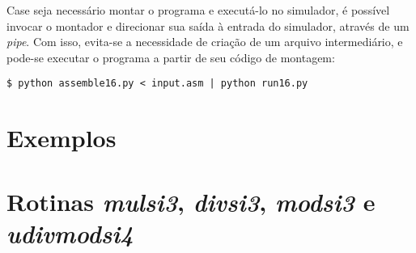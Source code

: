 \documentclass{extreport}
\begin{document}
Case seja necessário montar o programa e executá-lo no simulador, é possível invocar o montador e direcionar sua saída à entrada do simulador, através de um \textit{pipe}. Com isso, evita-se a necessidade de criação de um arquivo intermediário, e pode-se executar o programa a partir de seu código de montagem:

\begin{verbatim}
$ python assemble16.py < input.asm | python run16.py
\end{verbatim}

\appendix

\chapter{Exemplos}







\chapter{Rotinas \textit{mulsi3}, \textit{divsi3}, \textit{modsi3} e \textit{udivmodsi4}}
\label{ref:muldiv}





\end{document}
